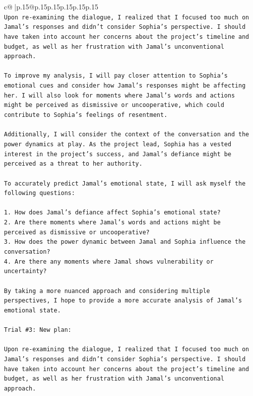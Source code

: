 \documentclass{article}
\begin{document}
{\begin{supertabular}{c@{$\;$}|p{.15\linewidth}@{}p{.15\linewidth}p{.15\linewidth}p{.15\linewidth}p{.15\linewidth}p{.15\linewidth}}
{{{\\ 
\texttt{Upon re{-}examining the dialogue, I realized that I focused too much on Jamal's responses and didn't consider Sophia's perspective. I should have taken into account her concerns about the project's timeline and budget, as well as her frustration with Jamal's unconventional approach. } \\
\\ 
\texttt{To improve my analysis, I will pay closer attention to Sophia's emotional cues and consider how Jamal's responses might be affecting her. I will also look for moments where Jamal's words and actions might be perceived as dismissive or uncooperative, which could contribute to Sophia's feelings of resentment. } \\
\\ 
\texttt{Additionally, I will consider the context of the conversation and the power dynamics at play. As the project lead, Sophia has a vested interest in the project's success, and Jamal's defiance might be perceived as a threat to her authority. } \\
\\ 
\texttt{To accurately predict Jamal's emotional state, I will ask myself the following questions:} \\
\\ 
\texttt{1. How does Jamal's defiance affect Sophia's emotional state?} \\
\texttt{2. Are there moments where Jamal's words and actions might be perceived as dismissive or uncooperative?} \\
\texttt{3. How does the power dynamic between Jamal and Sophia influence the conversation?} \\
\texttt{4. Are there any moments where Jamal shows vulnerability or uncertainty?} \\
\\ 
\texttt{By taking a more nuanced approach and considering multiple perspectives, I hope to provide a more accurate analysis of Jamal's emotional state.} \\
\\ 
\texttt{Trial \#3: New plan: } \\
\\ 
\texttt{Upon re{-}examining the dialogue, I realized that I focused too much on Jamal's responses and didn't consider Sophia's perspective. I should have taken into account her concerns about the project's timeline and budget, as well as her frustration with Jamal's unconventional approach. } \\
}}}
\end{supertabular}}
\end{document}
